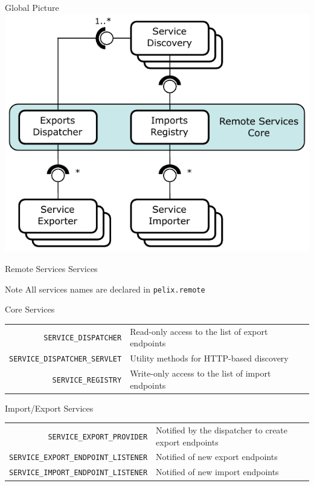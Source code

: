 \begin{frame}{Global Picture}
\centering
\includegraphics{../imgs/rs_arch}
\end{frame}

\begin{frame}{Remote Services Services}
\begin{exampleblock}{Note}
All services names are declared in \texttt{pelix.remote}
\end{exampleblock}

\begin{block}{Core Services}
\begin{small}
\begin{tabular}{rp{}}
\texttt{\scriptsize SERVICE\_DISPATCHER} & Read-only access to the list of export endpoints \\
\texttt{\scriptsize SERVICE\_DISPATCHER\_SERVLET} & Utility methods for HTTP-based discovery \\
\texttt{\scriptsize SERVICE\_REGISTRY} & Write-only access to the list of import endpoints \\
\end{tabular}
\end{small}
\end{block}

\begin{block}{Import/Export Services}
\begin{small}
\begin{tabular}{rp{}}
\texttt{\scriptsize SERVICE\_EXPORT\_PROVIDER} & Notified by the dispatcher to create export endpoints \\
\texttt{\scriptsize SERVICE\_EXPORT\_ENDPOINT\_LISTENER} & Notified of new export endpoints \\
\texttt{\scriptsize SERVICE\_IMPORT\_ENDPOINT\_LISTENER} & Notified of new import endpoints \\
\end{tabular}
\end{small}
\end{block}
\end{frame}

